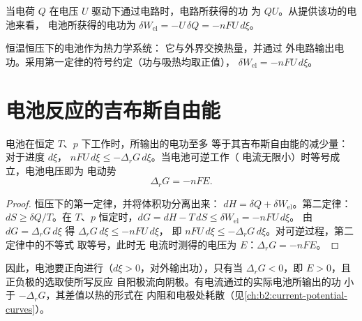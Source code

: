 当电荷 $Q$ 在电压 $U$ 驱动下通过电路时，电路所获得的功
为 $QU$。从提供该功的电池来看，
电池所获得的电功为 $\delta W_{\text{el}} = -U\,\delta Q = -nFU\,
d\xi$。

\begin{omfigure}

{\small 恒温恒压下的电池作为热力学系统：
它与外界交换热量，并通过
外电路输出电功。采用第一定律的符号约定（功与吸热均取正值），
$\delta W_{\text{el}} = -nFU\,d\xi$。}
\end{omfigure}

\section{电池反应的吉布斯自由能}

\begin{theorem}[电功与吉布斯自由能]\label{thm:b2:cell-thermodynamics:delta-g-nfe}
电池在恒定 $T$、$p$ 下工作时，所输出的电功至多
等于其吉布斯自由能的减少量：对于进度 $d\xi$，
$nFU\,d\xi \leq -\Delta_r G\,d\xi$。当电池可逆工作（
电流无限小）时等号成立，电池电压即为
电动势
\[
  \Delta_r G = -nFE .
\]
\end{theorem}

\begin{proof}
恒压下的第一定律，并将体积功分离出来：
$dH = \delta Q + \delta W_{\text{el}}$。第二定律：$dS \geq \delta Q/T$。在
$T$、$p$ 恒定时，$dG = dH - T\,dS \leq \delta W_{\text{el}} = -nFU\,d\xi$。
由 $dG = \Delta_r G\,d\xi$ 得 $\Delta_r G\,d\xi \leq -nFU\,d\xi$，
即 $nFU\,d\xi \leq -\Delta_r G\,d\xi$。对可逆过程，第二定律中的不等式
取等号，此时无
电流时测得的电压为 $E$：$\Delta_r G = -nFE$。
\end{proof}

因此，电池要正向进行（$d\xi > 0$，对外输出功），只有当 $\Delta_r G <
0$，即 $E > 0$，且正负极的选取使所写反应
自阳极流向阴极。有电流通过的实际电池所输出的功
小于 $-\Delta_r G$，其差值以热的形式在
内阻和电极处耗散（见\cref{ch:b2:current-potential-curves}）。

